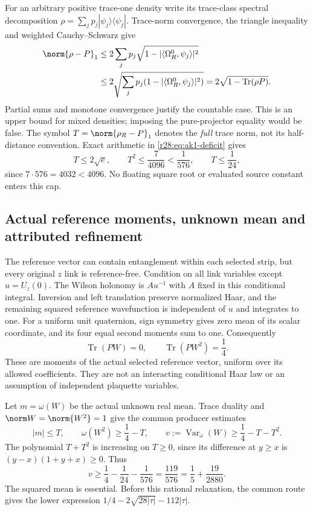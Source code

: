 For an arbitrary positive trace-one density write its trace-class spectral decomposition $\rho=\sum_jp_j|\psi_j\rangle\langle\psi_j|$. Trace-norm convergence, the triangle inequality and weighted Cauchy--Schwarz give
\begin{align}
 \norm{\rho-P}_1
 &\le2\sum_jp_j\sqrt{1-|\langle\Omega_R^0,\psi_j\rangle|^2}\\
 &\le2\sqrt{\sum_jp_j(1-|\langle\Omega_R^0,\psi_j\rangle|^2)}
 =2\sqrt{1-\operatorname{Tr}(\rho P)}.
 \label{r28:eq:ak1-trace}
\end{align}
Partial sums and monotone convergence justify the countable case. This is an upper bound for mixed densities; imposing the pure-projector equality would be false. The symbol $T=\norm{\rho_R-P}_1$ denotes the \emph{full} trace norm, not its half-distance convention. Exact arithmetic in \eqref{r28:eq:ak1-deficit} gives
\begin{equation}
 T\le2\sqrt e,\qquad T^2\le\frac7{4096}<\frac1{576},
 \qquad T\le\frac1{24},
 \label{r28:eq:ak1-trace-cap}
\end{equation}
since $7\cdot576=4032<4096$. No floating square root or evaluated source constant enters this cap.

\subsection{Actual reference moments, unknown mean and attributed refinement}
The reference vector can contain entanglement within each selected strip, but every original $z$ link is reference-free. Condition on all link variables except $u=U_z(0)$. The Wilson holonomy is $Au^{-1}$ with $A$ fixed in this conditional integral. Inversion and left translation preserve normalized Haar, and the remaining squared reference wavefunction is independent of $u$ and integrates to one. For a uniform unit quaternion, sign symmetry gives zero mean of its scalar coordinate, and its four equal second moments sum to one. Consequently
\begin{equation}
 \operatorname{Tr}(PW)=0,\qquad
 \operatorname{Tr}(PW^2)=\frac14.
 \label{r28:eq:ak1-reference-moments}
\end{equation}
These are moments of the actual selected reference vector, uniform over its allowed coefficients. They are not an interacting conditional Haar law or an assumption of independent plaquette variables.

Let $m=\omega(W)$ be the actual unknown real mean. Trace duality and $\norm W=\norm{W^2}=1$ give the common producer estimates
\begin{equation}
 |m|\le T,\qquad \omega(W^2)\ge\frac14-T,\qquad
 v:=\operatorname{Var}_\omega(W)\ge\frac14-T-T^2.
 \label{r28:eq:ak1-moments}
\end{equation}
The polynomial $T+T^2$ is increasing on $T\ge0$, since its difference at $y\ge x$ is $(y-x)(1+y+x)\ge0$. Thus
\begin{equation}
 v\ge\frac14-\frac1{24}-\frac1{576}
    =\frac{119}{576}=\frac15+\frac{19}{2880}.
 \label{r28:eq:ak1-producer-floor}
\end{equation}
The squared mean is essential. Before this rational relaxation, the common route gives the lower expression $1/4-2\sqrt{28|\tau|}-112|\tau|$.

